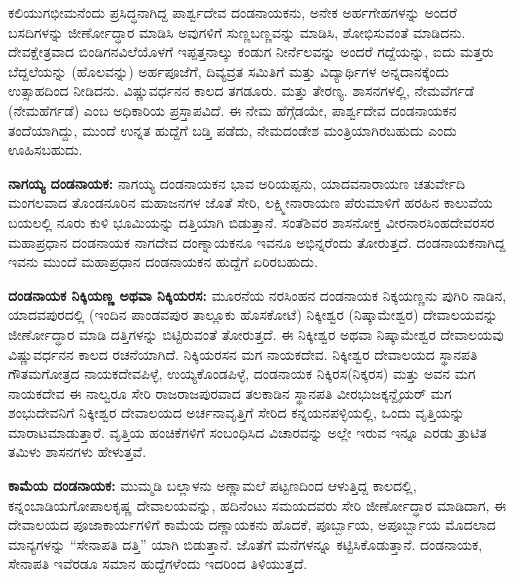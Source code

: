 \newpage

ಕಲಿಯುಗಭೀಮನೆಂದು ಪ್ರಸಿದ್ಧನಾಗಿದ್ದ ಪಾರ್ಶ್ವದೇವ ದಂಡನಾಯಕನು, ಅನೇಕ ಅರ್ಹಗೇಹಗಳನ್ನು ಅಂದರೆ ಬಸದಿ\-ಗಳನ್ನು ಜೀರ್ಣೋದ್ಧಾರ ಮಾಡಿಸಿ ಅವುಗಳಿಗೆ ಸುಣ್ಣಬಣ್ಣವನ್ನು ಮಾಡಿಸಿ, ಶೋಭಿಸುವಂತೆ ಮಾಡಿದನು. ದೇವಕ್ಷೇತ್ರವಾದ ಬಿಂಡಿಗನವಿಲೆಯೊಳಗೆ ಇಪ್ಪತ್ತನಾಲ್ಕು ಕಂಡುಗ ನೀರ್ನೆಲವನ್ನು ಅಂದರೆ ಗದ್ದೆಯನ್ನು, ಐದು ಮತ್ತರು ಬೆದ್ದಲೆಯನ್ನು (ಹೊಲವನ್ನು) ಅರ್ಹಪೂಜೆಗೆ, ದಿವ್ಯವ್ರತ ಸಮಿತಿಗೆ ಮತ್ತು ವಿದ್ಯಾರ್ಥಿಗಳ ಅನ್ನದಾನಕ್ಕೆಂದು ಉತ್ಸಾಹದಿಂದ ನೀಡಿದನು. ವಿಷ್ಣುವರ್ಧನನ ಕಾಲದ ತಗಡೂರು. ಮತ್ತು ತೇರಣ್ಯ. ಶಾಸನಗಳಲ್ಲಿ, ನೇಮವೆರ್ಗಡೆ (ನೇಮಹೆರ್ಗಡೆ) ಎಂಬ ಅಧಿಕಾರಿಯ ಪ್ರಸ್ತಾಪವಿದೆ. ಈ ನೇಮ ಹೆಗ್ಗೆಡಯೇ, ಪಾರ್ಶ್ವದೇವ ದಂಡನಾಯಕನ ತಂದೆಯಾಗಿದ್ದು, ಮುಂದೆ ಉನ್ನತ ಹುದ್ದೆಗೆ ಬಡ್ತಿ ಪಡೆದು, ನೇಮದಂಡೇಶ ಮಂತ್ರಿಯಾಗಿರಬಹುದು ಎಂದು ಊಹಿಸಬಹುದು.

\textbf{ನಾಗಯ್ಯ ದಂಡನಾಯಕ:} ನಾಗಯ್ಯ ದಂಡನಾಯಕನ ಭಾವ ಅರಿಯಪ್ಪನು, ಯಾದವನಾರಾಯಣ ಚತುರ್ವೇದಿ ಮಂಗಲವಾದ ತೊಂಡನೂರಿನ ಮಹಾಜನಗಳ ಜೊತೆ ಸೇರಿ, ಲಕ್ಷ್ಮೀನಾರಾಯಣ ಪೆರುಮಾಳಿಗೆ ಹರಹಿನ ಕಾಲುವೆಯ ಬಯಲಲ್ಲಿ ನೂರು ಕುಳಿ ಭೂಮಿಯನ್ನು ದತ್ತಿಯಾಗಿ ಬಿಡುತ್ತಾನೆ. ಸಂತೆಶಿವರ ಶಾಸನೋಕ್ತ ವೀರನಾರಸಿಂಹದೇವರಸರ ಮಹಾಪ್ರಧಾನ ದಂಡನಾಯಕ ನಾಗದೇವ ದಂಣ್ನಾಯಕನೂ ಇವನೂ ಅಭಿನ್ನರೆಂದು ತೋರುತ್ತದೆ. ದಂಡನಾಯಕನಾಗಿದ್ದ ಇವನು ಮುಂದೆ ಮಹಾಪ್ರಧಾನ ದಂಡನಾಯಕನ ಹುದ್ದೆಗೆ ಏರಿರಬಹುದು.

\textbf{ದಂಡನಾಯಕ ನಿಕ್ಕಿಯಣ್ಣ ಅಥವಾ ನಿಕ್ಕಿಯರಸ:} ಮೂರನೆಯ ನರಸಿಂಹನ ದಂಡನಾಯಕ ನಿಕ್ಕಯಣ್ಣನು ಪುಗಿರಿ ನಾಡಿನ, ಯಾದವಪುರದಲ್ಲಿ (ಇಂದಿನ ಪಾಂಡವಪುರ ತಾಲ್ಲೂಕು ಹೊಸಕೋಟೆ) ನಿಕ್ಕೀಶ್ವರ (ನಿಷ್ಕಾಮೇಶ್ವರ) ದೇವಾಲಯವನ್ನು ಜೀರ್ಣೋದ್ಧಾರ ಮಾಡಿ ದತ್ತಿಗಳನ್ನು ಬಿಟ್ಟಿರುವಂತೆ ತೋರುತ್ತದೆ. ಈ ನಿಕ್ಕೀಶ್ವರ ಅಥವಾ ನಿಷ್ಕಾಮೇಶ್ವರ ದೇವಾಲಯವು ವಿಷ್ಣುವರ್ಧನನ ಕಾಲದ ರಚನೆಯಾಗಿದೆ. ನಿಕ್ಕಿಯರಸನ ಮಗ ನಾಯಕದೇವ. ನಿಕ್ಕೀಶ್ವರ ದೇವಾಲಯದ ಸ್ಥಾನಪತಿ ಗೌತಮಗೋತ್ರದ ನಾಯಕದೇವಪಿಳ್ಳೆ, ಉಯ್ಯಕೊಂಡಪಿಳ್ಳೆ, ದಂಡನಾಯಕ ನಿಕ್ಕಿರಸ(ನಿಕ್ಕರಸ) ಮತ್ತು ಅವನ ಮಗ ನಾಯಕದೇವ ಈ ನಾಲ್ವರೂ ಸೇರಿ ರಾಜರಾಜಪುರ\-ವಾದ ತಲಕಾಡಿನ ಸ್ಥಾನಪತಿ ವೀರಭುಜಕ್ಕನ್ದೈಯರ್​ ಮಗ ಶಂಭುದೇವನಿಗೆ ನಿಕ್ಕೀಶ್ವರ ದೇವಾಲಯದ ಅರ್ಚನಾವೃತ್ತಿಗೆ ಸೇರಿದ ಕನ್ನಯನಪಳ್ಳಿಯಲ್ಲಿ, ಒಂದು ವೃತ್ತಿಯನ್ನು ಮಾರಾಟಮಾಡುತ್ತಾರೆ. ವೃತ್ತಿಯ ಹಂಚಿಕೆಗಳಿಗೆ ಸಂಬಂಧಿಸಿದ ವಿಚಾರವನ್ನು ಅಲ್ಲೇ ಇರುವ ಇನ್ನೂ ಎರಡು ತ್ರುಟಿತ ತಮಿಳು ಶಾಸನಗಳು ಹೇಳುತ್ತವೆ.

\textbf{ಕಾಮೆಯ ದಂಡನಾಯಕ:} ಮುಮ್ಮಡಿ ಬಲ್ಲಾಳನು ಅಣ್ಣಾಮಲೆ ಪಟ್ಟಣದಿಂದ ಆಳುತ್ತಿದ್ದ ಕಾಲದಲ್ಲಿ, ಕನ್ನಂಬಾಡಿಯ\break ಗೋಪಾಲಕೃಷ್ಣ ದೇವಾಲಯವನ್ನು, ಹದಿನೆಂಟು ಸಮಯದವರು ಸೇರಿ ಜೀರ್ಣೋದ್ಧಾರ ಮಾಡಿದಾಗ, ಈ ದೇವಾಲಯದ ಪೂಜಾಕಾರ್ಯಗಳಿಗೆ ಕಾಮೆಯ ದಣ್ಣಾಯಕನು ಹೊದಕೆ, ಪೂರ್ಬ್ಬಾಯ, ಅಪೂರ್ಬ್ಬಾಯ ಮೊದಲಾದ ಮಾನ್ಯಗಳನ್ನು “ಸೇನಾಪತಿ ದತ್ತಿ” ಯಾಗಿ ಬಿಡುತ್ತಾನೆ. ಜೊತೆಗೆ ಮನೆಗಳನ್ನೂ ಕಟ್ಟಿಸಿಕೊಡುತ್ತಾನೆ. ದಂಡನಾಯಕ, ಸೇನಾಪತಿ ಇವೆರಡೂ ಸಮಾನ ಹುದ್ದೆಗಳೆಂದು ಇದರಿಂದ ತಿಳಿಯುತ್ತದೆ.

